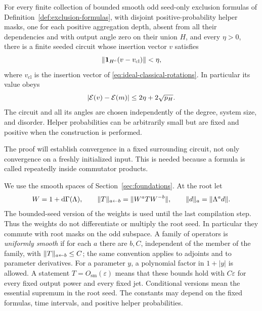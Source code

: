 \begin{theorem}
\label{thm:classical-synthesis}
For every finite collection of bounded smooth odd seed-only exclusion
formulas of Definition~\ref{def:exclusion-formulas}, with disjoint
positive-probability helper masks, one for each positive aggregation
depth, absent from all their dependencies and with output angle zero on
their union \(H\), and every \(\eta>0\), there is a finite seeded
circuit whose insertion vector \(v\) satisfies
\begin{equation}
 \lVert \mathbf 1_{H^c}(v-v_{\mathrm{cl}})\rVert<\eta,
 \label{eq:synthesis-insertion}
\end{equation}
where \(v_{\mathrm{cl}}\) is the insertion vector of
\eqref{eq:ideal-classical-rotations}.  In particular its value obeys
\begin{equation}
 \lvert \mathcal E(v)-\mathcal E(m)\rvert\le 2\eta+2\sqrt{p_H}.
 \label{eq:synthesis-energy}
\end{equation}
The circuit and all its angles are chosen independently of the degree,
system size, and disorder.  Helper probabilities can be arbitrarily
small but are fixed and positive when the construction is performed.
\end{theorem}

The proof will establish convergence in a fixed surrounding circuit,
not only convergence on a freshly initialized input.  This is needed
because a formula is called repeatedly inside commutator products.

We use the smooth spaces of Section~\ref{sec:foundations}.  At the
root let
\[
 W=1+\mathrm d\Gamma(\Lambda),\qquad
 \lVert T\rVert_{a\leftarrow b}=\lVert W^aTW^{-b}\rVert,\qquad
 \lVert d\rVert_{a}=\lVert \Lambda^a d\rVert.
\]
The bounded-seed version of the weights is used until the last
compilation step.  Thus the weights do not differentiate or multiply
the root seed.  In particular they commute with root masks on the odd
subspace.  A family of operators is \emph{uniformly smooth} if for
each \(a\) there are \(b,C\), independent of the member of the
family, with \(\lVert T\rVert_{a\leftarrow b}\le C\); the same convention
applies to adjoints and to parameter derivatives.  For a parameter
\(y\), a polynomial factor in \(1+|y|\) is allowed.  A statement
\(T=O_{\mathrm{sm}}(\varepsilon)\) means that these bounds hold
with \(C\varepsilon\) for every fixed output power and every fixed
jet.  Conditional versions mean the essential supremum in the root
seed.  The constants may depend on the fixed formulas, time intervals,
and positive helper probabilities.

